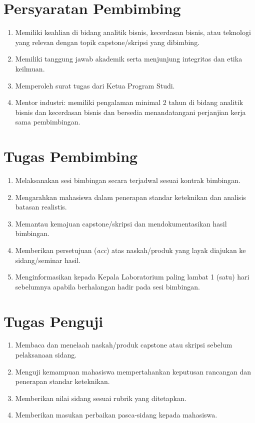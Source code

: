 \documentclass[12pt,a4paper]{report}
\begin{document}
\section{Persyaratan Pembimbing}
\begin{enumerate}
\item Memiliki keahlian di bidang analitik bisnis, kecerdasan bisnis, atau teknologi yang relevan dengan topik capstone/skripsi yang dibimbing.
\item Memiliki tanggung jawab akademik serta menjunjung integritas dan etika keilmuan.
\item Memperoleh surat tugas dari Ketua Program Studi.
\item Mentor industri: memiliki pengalaman minimal 2 tahun di bidang analitik bisnis dan kecerdasan bisnis dan bersedia menandatangani perjanjian kerja sama pembimbingan.
\end{enumerate}

\section{Tugas Pembimbing}
\begin{enumerate}
\item Melaksanakan sesi bimbingan secara terjadwal sesuai kontrak bimbingan.
\item Mengarahkan mahasiswa dalam penerapan standar keteknikan dan analisis batasan realistis.
\item Memantau kemajuan capstone/skripsi dan mendokumentasikan hasil bimbingan.
\item Memberikan persetujuan (\emph{acc}) atas naskah/produk yang layak diajukan ke sidang/seminar hasil.
\item Menginformasikan kepada Kepala Laboratorium paling lambat 1 (satu) hari sebelumnya apabila berhalangan hadir pada sesi bimbingan.
\end{enumerate}

\section{Tugas Penguji}
\begin{enumerate}
\item Membaca dan menelaah naskah/produk capstone atau skripsi sebelum pelaksanaan sidang.
\item Menguji kemampuan mahasiswa mempertahankan keputusan rancangan dan penerapan standar keteknikan.
\item Memberikan nilai sidang sesuai rubrik yang ditetapkan.
\item Memberikan masukan perbaikan pasca-sidang kepada mahasiswa.
\end{enumerate}
\end{document}
